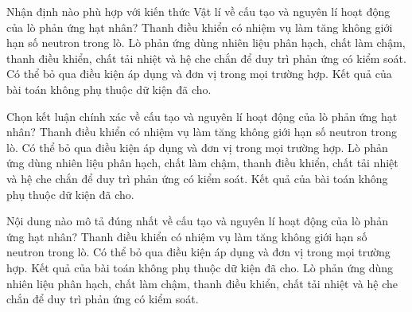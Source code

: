 \begin{ex}
Nhận định nào phù hợp với kiến thức Vật lí về cấu tạo và nguyên lí hoạt động của lò phản ứng hạt nhân?
\choice
{Thanh điều khiển có nhiệm vụ làm tăng không giới hạn số neutron trong lò.}
{\True Lò phản ứng dùng nhiên liệu phân hạch, chất làm chậm, thanh điều khiển, chất tải nhiệt và hệ che chắn để duy trì phản ứng có kiểm soát.}
{Có thể bỏ qua điều kiện áp dụng và đơn vị trong mọi trường hợp.}
{Kết quả của bài toán không phụ thuộc dữ kiện đã cho.}
\end{ex}

\begin{ex}
Chọn kết luận chính xác về cấu tạo và nguyên lí hoạt động của lò phản ứng hạt nhân?
\choice
{Thanh điều khiển có nhiệm vụ làm tăng không giới hạn số neutron trong lò.}
{Có thể bỏ qua điều kiện áp dụng và đơn vị trong mọi trường hợp.}
{\True Lò phản ứng dùng nhiên liệu phân hạch, chất làm chậm, thanh điều khiển, chất tải nhiệt và hệ che chắn để duy trì phản ứng có kiểm soát.}
{Kết quả của bài toán không phụ thuộc dữ kiện đã cho.}
\end{ex}

\begin{ex}
Nội dung nào mô tả đúng nhất về cấu tạo và nguyên lí hoạt động của lò phản ứng hạt nhân?
\choice
{Thanh điều khiển có nhiệm vụ làm tăng không giới hạn số neutron trong lò.}
{Có thể bỏ qua điều kiện áp dụng và đơn vị trong mọi trường hợp.}
{Kết quả của bài toán không phụ thuộc dữ kiện đã cho.}
{\True Lò phản ứng dùng nhiên liệu phân hạch, chất làm chậm, thanh điều khiển, chất tải nhiệt và hệ che chắn để duy trì phản ứng có kiểm soát.}
\end{ex}

